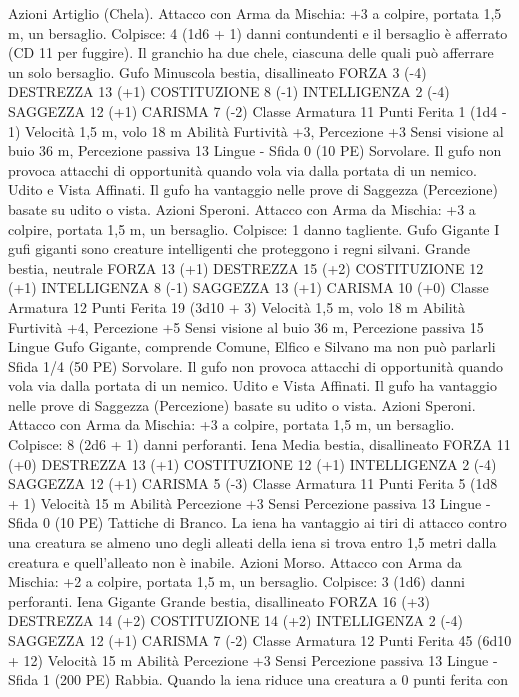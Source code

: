 \begin{multicols}{2}
Azioni
Artiglio (Chela). Attacco con Arma da Mischia: +3 a colpire,
portata 1,5 m, un bersaglio.
Colpisce: 4 (1d6 + 1) danni contundenti e il bersaglio è afferrato
(CD 11 per fuggire). Il granchio ha due chele, ciascuna delle
quali può afferrare un solo bersaglio.
Gufo
Minuscola bestia, disallineato
FORZA 3 (-4)
DESTREZZA 13 (+1)
COSTITUZIONE 8 (-1)
INTELLIGENZA 2 (-4)
SAGGEZZA 12 (+1)
CARISMA 7 (-2)
Classe Armatura 11
Punti Ferita 1 (1d4 - 1)
Velocità 1,5 m, volo 18 m
Abilità Furtività +3, Percezione +3
Sensi visione al buio 36 m, Percezione passiva 13
Lingue -
Sfida 0 (10 PE)
Sorvolare. Il gufo non provoca attacchi di opportunità quando
vola via dalla portata di un nemico.
Udito e Vista Affinati. Il gufo ha vantaggio nelle prove di
Saggezza (Percezione) basate su udito o vista.
Azioni
Speroni. Attacco con Arma da Mischia: +3 a colpire, portata 1,5
m, un bersaglio.
Colpisce: 1 danno tagliente.
Gufo Gigante
I gufi giganti sono creature intelligenti che proteggono i
regni silvani.
Grande bestia, neutrale
FORZA 13 (+1)
DESTREZZA 15 (+2)
COSTITUZIONE 12 (+1)
INTELLIGENZA 8 (-1)
SAGGEZZA 13 (+1)
CARISMA 10 (+0)
Classe Armatura 12
Punti Ferita 19 (3d10 + 3)
Velocità 1,5 m, volo 18 m
Abilità Furtività +4, Percezione +5
Sensi visione al buio 36 m, Percezione passiva 15
Lingue Gufo Gigante, comprende Comune, Elfico e Silvano ma
non può parlarli
Sfida 1/4 (50 PE)
Sorvolare. Il gufo non provoca attacchi di opportunità quando
vola via dalla portata di un nemico.
Udito e Vista Affinati. Il gufo ha vantaggio nelle prove di
Saggezza (Percezione) basate su udito o vista.
Azioni
Speroni. Attacco con Arma da Mischia: +3 a colpire, portata 1,5
m, un bersaglio.
Colpisce: 8 (2d6 + 1) danni perforanti.
Iena
Media bestia, disallineato
FORZA 11 (+0)
DESTREZZA 13 (+1)
COSTITUZIONE 12 (+1)
INTELLIGENZA 2 (-4)
SAGGEZZA 12 (+1)
CARISMA 5 (-3)
Classe Armatura 11
Punti Ferita 5 (1d8 + 1)
Velocità 15 m
Abilità Percezione +3
Sensi Percezione passiva 13
Lingue -
Sfida 0 (10 PE)
Tattiche di Branco. La iena ha vantaggio ai tiri di attacco contro
una creatura se almeno uno degli alleati della iena si trova entro
1,5 metri dalla creatura e quell’alleato non è inabile.
Azioni
Morso. Attacco con Arma da Mischia: +2 a colpire, portata 1,5
m, un bersaglio.
Colpisce: 3 (1d6) danni perforanti.
Iena Gigante
Grande bestia, disallineato
FORZA 16 (+3)
DESTREZZA 14 (+2)
COSTITUZIONE 14 (+2)
INTELLIGENZA 2 (-4)
SAGGEZZA 12 (+1)
CARISMA 7 (-2)
Classe Armatura 12
Punti Ferita 45 (6d10 + 12)
Velocità 15 m
Abilità Percezione +3
Sensi Percezione passiva 13
Lingue -
Sfida 1 (200 PE)
Rabbia. Quando la iena riduce una creatura a 0 punti ferita con

\end{multicols}
